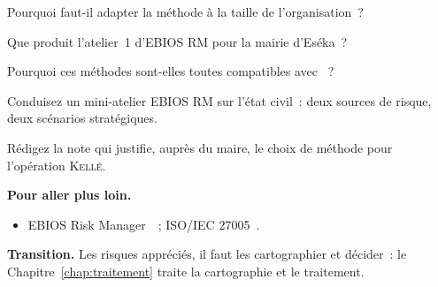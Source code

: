 \begin{boxexo}[title={\ding{45}\quad Exercice~12.6. Adapter \niveaumoyen}]
Pourquoi faut-il adapter la méthode à la taille de l'organisation~?
\end{boxexo}

\begin{boxexo}[title={\ding{45}\quad Exercice~12.7. Atelier 1 \niveaumoyen}]
Que produit l'atelier~1 d'EBIOS RM pour la mairie d'Eséka~?
\end{boxexo}

\begin{boxexo}[title={\ding{45}\quad Exercice~12.8. Compatibilité ISO \niveaumoyen}]
Pourquoi ces méthodes sont-elles toutes compatibles avec ~?
\end{boxexo}

\begin{boxexo}[title={\ding{45}\quad Exercice~12.9. Mini-EBIOS \niveauexpert}]
Conduisez un mini-atelier EBIOS RM sur l'état civil~: deux sources de risque,
deux scénarios stratégiques.
\end{boxexo}

\begin{boxexo}[title={\ding{45}\quad Exercice~12.10. Note de méthode \niveauexpert}]
Rédigez la note qui justifie, auprès du maire, le choix de méthode pour
l'opération \textsc{Kellé}.
\end{boxexo}

\bigskip

\begin{boxinfo}
\textbf{Pour aller plus loin.}
\begin{itemize}
    \item EBIOS Risk Manager~\cite{ebios2018}~; ISO/IEC 27005~\cite{iso27005}.
\end{itemize}
\end{boxinfo}

\begin{boxinfo}
\textbf{Transition.} Les risques appréciés, il faut les cartographier et
décider~: le Chapitre~\ref{chap:traitement} traite la cartographie et le
traitement.
\end{boxinfo}

